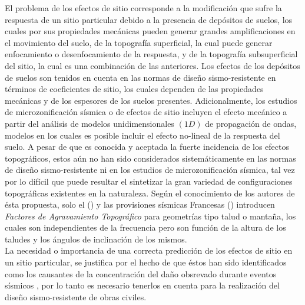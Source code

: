 \documentclass[spanish,letterpaper,12pt,twoside,openany]{article}
\begin{document}
%
El problema de los efectos de sitio corresponde a la modificación que sufre la respuesta de un sitio particular debido a la presencia de depósitos de suelos, los cuales por sus propiedades mecánicas pueden generar grandes amplificaciones en el movimiento del suelo, de la topografía superficial, la cual puede generar enfocamiento o desenfocamiento de la respuesta, y de la topografía subsuperficial del sitio, la cual es una combinación de las anteriores. Los efectos de los depósitos de suelos son tenidos en cuenta en las normas de diseño sismo-resistente \citep{NSR-10} en términos de coeficientes de sitio, los cuales dependen de las propiedades mecánicas y de los espesores de los suelos presentes. Adicionalmente, los estudios de microzonificación sísmica o de efectos de sitio incluyen el efecto mecánico a partir del análisis de modelos unidimensionales $\left( 1D \right)$ de propagación de ondas, modelos en los cuales es posible incluir el efecto no-lineal de la respuesta del suelo. A pesar de que es conocida y aceptada la fuerte incidencia de los efectos topográficos, estos aún no han sido considerados sistemáticamente en las normas de diseño sismo-resistente ni en los estudios de microzonificación sísmica, tal vez por lo difícil que puede resultar el sintetizar la gran variedad de configuraciones topográficas existentes en la naturaleza. Según el conocimiento de los autores de ésta propuesta, solo el \citeauthor{EC8} (\citeyear{EC8}) y las provisiones sísmicas Francesas \citeauthor{AFPS1995} (\citeyear{AFPS1995}) introducen \textit{Factores de Agravamiento Topográfico} para geometrías tipo talud o mantaña, los cuales son independientes de la frecuencia pero son función de la altura de los taludes y los ángulos de inclinación de los mismos.\\
%
La necesidad o importancia de una correcta predicción de los efectos de sitio en un sitio particular, se justifica por el hecho de que éstos han sido identificados como los causantes de la concentración del daño obsrevado durante eventos sísmicos \citep[por ejemplo en][]{Assimaki2013, Hough2011}, por lo tanto es necesario tenerlos en cuenta para la realización del diseño sismo-resistente de obras civiles.

%
\end{document}
